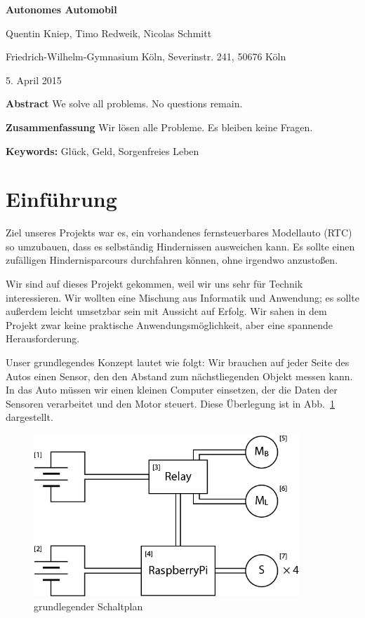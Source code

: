 \documentclass[a4paper,12pt]{article}
\begin{document}
{\Large\bf Autonomes Automobil}

\medskip

Quentin Kniep, Timo Redweik, Nicolas Schmitt

\medskip

Friedrich-Wilhelm-Gymnasium K\"oln, Severinstr. 241, 50676 K\"oln

\medskip

5. April  2015

\medskip

{\bf  Abstract}
{\small We solve all problems. No questions remain.}

\medskip

{\bf  Zusammenfassung}
{\small Wir l\"osen alle Probleme. Es bleiben keine Fragen.}

\medskip

{\bf  Keywords:}
{\small Gl\"uck, Geld, Sorgenfreies Leben}

\bigskip


\section{Einf\"uhrung}\label{sec1}

Ziel unseres Projekts war es, ein vorhandenes fernsteuerbares Modellauto (RTC) so umzubauen, dass es selbst\"andig Hindernissen ausweichen kann.
Es sollte einen zuf\"alligen Hindernisparcours durchfahren k\"onnen, ohne irgendwo anzusto\ss{}en.

Wir sind auf dieses Projekt gekommen, weil wir uns sehr f\"ur Technik interessieren.
Wir wollten eine Mischung aus Informatik und Anwendung; es sollte au\ss{}erdem leicht umsetzbar sein mit Aussicht auf Erfolg.
Wir sahen in dem Projekt zwar keine praktische Anwendungsm\"oglichkeit, aber eine spannende Herausforderung.

Unser grundlegendes Konzept lautet wie folgt:
Wir brauchen auf jeder Seite des Autos einen Sensor, den den Abstand zum n\"achstliegenden Objekt messen kann.
In das Auto m\"ussen wir einen kleinen Computer einsetzen, der die Daten der Sensoren verarbeitet und den Motor steuert.
Diese \"Uberlegung ist in Abb.~\ref{Fig1} dargestellt.

\begin{figure}[h]
	\centering
	\includegraphics[width=10cm]{./media/circuit_general.png}
	\caption{grundlegender Schaltplan}
	\label{Fig1}
\end{figure}
\end{document}
